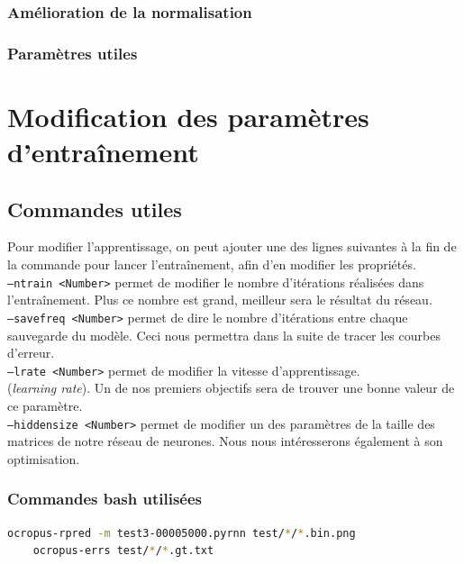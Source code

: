 \documentclass{article}
\begin{document}
\subsubsection{Amélioration de la normalisation}



\subsubsection{Paramètres utiles}


\section{Modification des paramètres d'entraînement}

\subsection{Commandes utiles}

Pour modifier l'apprentissage, on peut ajouter une des lignes suivantes à la fin de la commande pour lancer l'entraînement, afin d'en modifier les propriétés. \\
\noindent \texttt{--ntrain <Number>} permet de modifier le nombre d'itérations réalisées dans l'entraînement. Plus ce nombre est grand, meilleur sera le résultat du réseau. \\
\texttt{--savefreq <Number>} permet de dire le nombre d'itérations entre chaque sauvegarde du modèle. Ceci nous permettra dans la suite de tracer les courbes d'erreur. \\
\texttt{--lrate <Number>} permet de modifier la vitesse d'apprentissage. \\ (\textit{learning rate}). Un de nos premiers objectifs sera de trouver une bonne valeur de ce paramètre. \\
\texttt{--hiddensize <Number>} permet de modifier un des paramètres de la taille des matrices de notre réseau de neurones. Nous nous intéresserons également à son optimisation. \\

\subsubsection{Commandes bash utilisées}

\begin{lstlisting}[language=bash]
    ocropus-rpred -m test3-00005000.pyrnn test/*/*.bin.png
    ocropus-errs test/*/*.gt.txt
\end{lstlisting}
\end{document}

